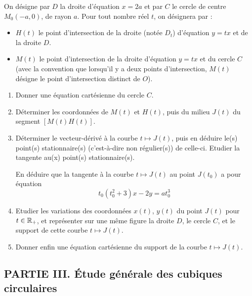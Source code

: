 \medskip
On d{\'e}signe par $D$ la droite d'{\'e}quation $x = 2a$ et par $C$
le cercle de centre $M_{0} (-a, 0)$, de rayon $a$.\newline
Pour tout nombre r{\'e}el $t$, on d{\'e}signera par :
\begin{itemize}
\item $H(t)$ le point d'intersection de la droite (notée $D_t$) d'{\'e}quation $y = tx$ et de la droite $D$.
\item $M(t)$ le point d'intersection de la droite d'{\'e}quation $y = tx$ et du cercle $C$ (avec la convention que lorsqu'il y a deux points d'intersection, $M(t)$ d{\'e}signe le point d'intersection distinct de $O$).
\end{itemize}
\begin{enumerate}
\item Donner une {\'e}quation cart{\'e}sienne du cercle $C$.
\item D{\'e}terminer les coordonn{\'e}es de $M(t)$ et $H(t)$, puis du milieu $J(t)$ du segment $[M(t)H(t)]$.
\item D{\'e}terminer le vecteur-d{\'e}riv{\'e} {\`a} la courbe $t \mapsto J(t)$, puis en d{\'e}duire le(s) point(s) stationnaire(s)
 (c'est-{\`a}-dire non r{\'e}gulier(s)) de celle-ci. Etudier la tangente au(x) point(s) stationnaire(s).

En d{\'e}duire que la tangente {\`a} la courbe $t \mapsto J(t)$ au
point $J(t_{0})$ a pour {\'e}quation 
$$ t_{0} (t_{0}^{2} + 3)x - 2y = a t_{0}^{3} $$

\item Etudier les variations des coordonn{\'e}es $x(t)$, $y(t)$ du point $J(t)$ pour $t \in \mathbb{R}_{+}$, et repr{\'e}senter sur une m{\^e}me figure la droite $D$, le cercle $C$, et le support de cette courbe $t \mapsto J(t)$.

\item Donner enfin une {\'e}quation cart{\'e}sienne du support de la courbe $t \mapsto J(t)$.
\end{enumerate}



\subsection*{PARTIE III. \'Etude g{\'e}n{\'e}rale des cubiques
circulaires}

